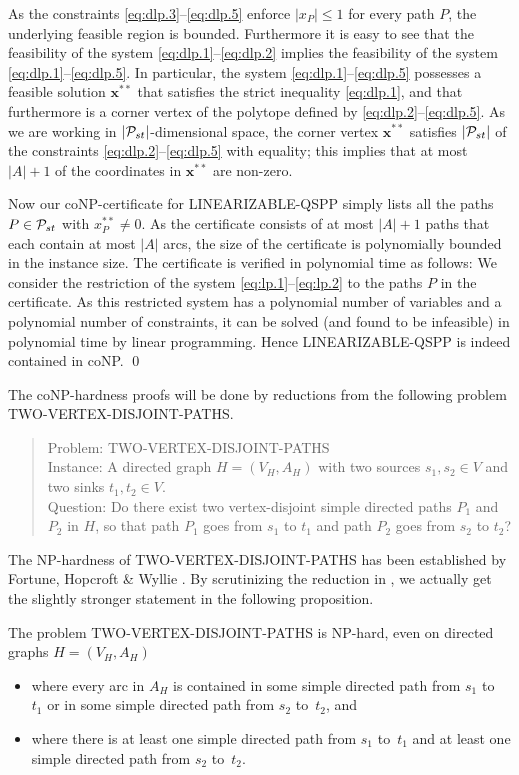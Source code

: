 As the constraints \eqref{eq:dlp.3}--\eqref{eq:dlp.5} enforce $|x_P|\le1$ for every path $P$, 
the underlying feasible region is bounded.
Furthermore it is easy to see that the feasibility of the system \eqref{eq:dlp.1}--\eqref{eq:dlp.2} 
implies the feasibility of the system \eqref{eq:dlp.1}--\eqref{eq:dlp.5}.
In particular, the system \eqref{eq:dlp.1}--\eqref{eq:dlp.5} possesses a feasible solution $\pmb x^{**}$ 
that satisfies the strict inequality \eqref{eq:dlp.1}, and 
that furthermore is a corner vertex of the polytope defined by \eqref{eq:dlp.2}--\eqref{eq:dlp.5}.
As we are working in $|{\cal P}_{st}|$-dimensional space, the corner vertex $\pmb x^{**}$ satisfies $|{\cal P}_{st}|$ of 
the constraints \eqref{eq:dlp.2}--\eqref{eq:dlp.5} with equality; this implies that at most $|A|+1$ 
of the coordinates in $\pmb x^{**}$ are non-zero.

Now our coNP-certificate for LINEARIZABLE-QSPP simply lists all the paths $P\in{\cal P}_{st}$ with $x^{**}_P\ne0$.
As the certificate consists of at most $|A|+1$ paths that each contain at most $|A|$ arcs, the
size of the certificate is polynomially bounded in the instance size.
The certificate is verified in polynomial time as follows:
We consider the restriction of the system \eqref{eq:lp.1}--\eqref{eq:lp.2} to the paths $P$ 
in the certificate.
As this restricted system has a polynomial number of variables and a polynomial number of constraints,
it can be solved (and found to be infeasible) in polynomial time by linear programming.
Hence LINEARIZABLE-QSPP is indeed contained in coNP.
\qed

\bigskip
The coNP-hardness proofs will be done by reductions from the following problem TWO-VERTEX-DISJOINT-PATHS.
\begin{quote}
Problem: TWO-VERTEX-DISJOINT-PATHS
\\[1.0ex]
Instance: A directed graph $H=(V_H,A_H)$ with two sources $s_1,s_2\in V$ and two sinks $t_1,t_2\in V$.
\\[1.0ex]
Question: Do there exist two vertex-disjoint simple directed paths $P_1$ and $P_2$ in $H$,
so that path $P_1$ goes from $s_1$ to $t_1$ and path $P_2$ goes from $s_2$ to $t_2$?
\end{quote}
The NP-hardness of TWO-VERTEX-DISJOINT-PATHS has been established by Fortune, Hopcroft \& Wyllie \cite{FoHoWy1980}.
By scrutinizing the reduction in \cite{FoHoWy1980}, we actually get the slightly stronger statement
in the following proposition.
\begin{proposition}
\label{pr:FHW}
\cite{FoHoWy1980}
The problem TWO-VERTEX-DIS\-JOINT-PATHS is NP-hard, even on directed graphs $H=(V_H,A_H)$
\begin{itemize}
\item where every arc in $A_H$ is contained in some simple directed path from $s_1$ to~$t_1$ 
or in some simple directed path from $s_2$ to~$t_2$, and
\item where there is at least one simple directed path from $s_1$ to~$t_1$ 
and at least one simple directed path from $s_2$ to~$t_2$.
\end{itemize}
\end{proposition}

